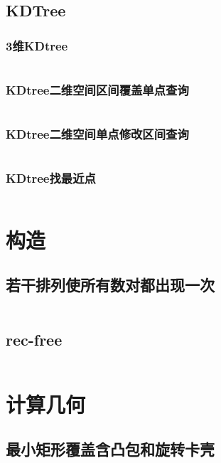 \documentclass[a4paper,11pt]{article}
\begin{document}
\subsection{KDTree}
\subsubsection{3维KDtree}
\inputminted[breaklines]{c++}{数据结构/3维KDtree.cpp}

\subsubsection{KDtree二维空间区间覆盖单点查询}
\inputminted[breaklines]{c++}{数据结构/KDtree二维空间区间覆盖单点查询.cpp}

\subsubsection{KDtree二维空间单点修改区间查询}
\inputminted[breaklines]{c++}{数据结构/KDtree二维空间单点修改区间查询.cpp}

\subsubsection{KDtree找最近点}
\inputminted[breaklines]{c++}{数据结构/KDtree找最近点.cpp}

\newpage
\section{构造}
\subsection{若干排列使所有数对都出现一次}
\inputminted[breaklines]{c++}{构造/若干排列使所有数对都出现一次.cpp}

\subsection{rec-free}
\inputminted[breaklines]{c++}{构造/rec-free.cpp}

\newpage
\section{计算几何}
\subsection{最小矩形覆盖含凸包和旋转卡壳}
\inputminted[breaklines]{c++}{计算几何/最小矩形覆盖含凸包和旋转卡壳.cpp}
\end{document}
